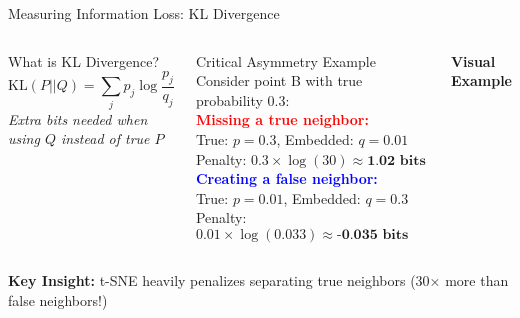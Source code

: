 \documentclass[aspectratio=169]{beamer}
\begin{document}
\begin{frame}{Measuring Information Loss: KL Divergence}
\vspace{-3mm}
\begin{columns}
\begin{block}{What is KL Divergence?}
$$\text{KL}(P||Q) = \sum_j p_j \log\frac{p_j}{q_j}$$
\small
\textit{Extra bits needed when using $Q$ instead of true $P$}
\end{block}

\vspace{2mm}
\begin{block}{Critical Asymmetry Example}
\small
Consider point B with true probability 0.3:\\[2mm]
\textcolor{red}{\textbf{Missing a true neighbor:}}\\
True: $p = 0.3$, Embedded: $q = 0.01$\\
Penalty: $0.3 \times \log(30) \approx \textbf{1.02 bits}$\\[2mm]

\textcolor{blue}{\textbf{Creating a false neighbor:}}\\
True: $p = 0.01$, Embedded: $q = 0.3$\\
Penalty: $0.01 \times \log(0.033) \approx \textbf{-0.035 bits}$
\end{block}

\begin{center}
\textbf{Visual Example}\\[2mm]
\end{center}
\end{columns}

\vspace{2mm}
\begin{center}
\colorbox{yellow!20}{\parbox{0.9\textwidth}{\centering
\textbf{Key Insight:} t-SNE heavily penalizes separating true neighbors (30× more than false neighbors!)}}
\end{center}
\end{frame}
\end{document}
